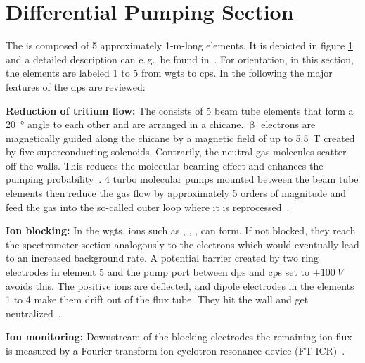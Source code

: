 \section{Differential Pumping Section}
\label{sec:katrinExpSetupDiffPumpingSection}
\begin{figure}[t]
 \label{fig:katrinExpSetupDiffPumpingSection}
\end{figure}
The  is composed of 5 approximately 1-m-long elements. It is depicted in figure \ref{fig:katrinExpSetupDiffPumpingSection} and a detailed description can e.\,g.~be found in~\cite{Kosmider2012}. For orientation, in this section, the elements are labeled 1 to 5 from \gls{wgts} to \gls{cps}. In the following the major features of the \gls{dps} are reviewed:

{\par\textbf{Reduction of tritium flow:}
The  consists of 5 beam tube elements that form a \SI{20}{\degree} angle to each other and are arranged in a chicane. $\upbeta$ electrons are magnetically guided along the chicane by a magnetic field of up to \SI{5.5}{T} created by five superconducting solenoids. Contrarily, the neutral gas molecules scatter off the walls. This reduces the molecular beaming effect and enhances the pumping probability~\cite{ZHANG2012}. 4 turbo molecular pumps mounted between the beam tube elements then reduce the gas flow by approximately 5 orders of magnitude and feed the gas into the so-called outer loop where it is reprocessed~\cite{Kosmider2012}.}

{\par\textbf{Ion blocking:}
In the \gls{wgts}, ions such as , , ,  can form. If not blocked, they reach the spectrometer section analogously to the electrons which would eventually lead to an increased background rate. A potential barrier created by two ring electrodes in element 5 and the pump port between \gls{dps} and \gls{cps} set to $+\SI{100}{V}$ avoids this. The positive ions are deflected, and dipole electrodes in the elements 1 to 4 make them drift out of the flux tube. They hit the wall and get neutralized~\cite{Klein2019}.}

{\par\textbf{Ion monitoring:}
Downstream of the blocking electrodes the remaining ion flux is measured by a Fourier transform ion cyclotron resonance device (FT-ICR)~\cite{Ubieto2009}.}
